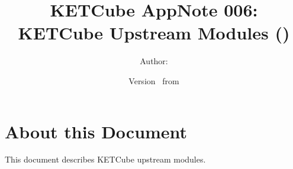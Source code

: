   




\title{\UWBLogo KETCube AppNote 006:\\ KETCube Upstream Modules (\vhCurrentVersion)}

\author{Author: \vhListAllAuthorsLongWithAbbrev}
\date{Version \vhCurrentVersion\ from \vhCurrentDate}

  




  


\section*{About this Document}


This document describes KETCube upstream modules. 

\setcounter{tocdepth}{2}
\tableofcontents
\clearpage

\listoffigures
\listoftables
\begin{versionhistory}
\end{versionhistory}
\setcounter{table}{0}

\clearpage 
{} 
\pagestyle{headings} 

\clearpage

